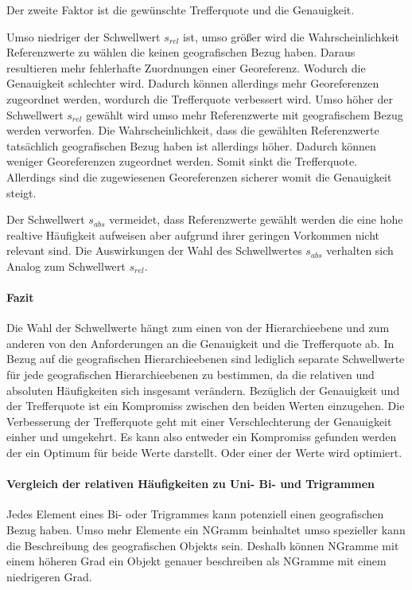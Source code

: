 				Der zweite Faktor ist die gewünschte Trefferquote und die Genauigkeit.

				Umso niedriger der Schwellwert $s_{rel}$ ist, umso größer wird die Wahrscheinlichkeit Referenzwerte zu wählen die keinen geografischen Bezug haben.
				Daraus resultieren mehr fehlerhafte Zuordnungen einer Georeferenz.
				Wodurch die Genauigkeit schlechter wird.
				Dadurch können allerdings mehr Georeferenzen zugeordnet werden, wordurch die Trefferquote verbessert wird.
				Umso höher der Schwellwert $s_{rel}$ gewählt wird umso mehr Referenzwerte mit geografischem Bezug werden verworfen.
				Die Wahrscheinlichkeit, dass die gewählten Referenzwerte tatsächlich geografischen Bezug haben ist allerdings höher.
				Dadurch können weniger Georeferenzen zugeordnet werden.
				Somit sinkt die Trefferquote.
				Allerdings sind die zugewiesenen Georeferenzen sicherer womit die Genauigkeit steigt.

				Der Schwellwert $s_{abs}$ vermeidet, dass Referenzwerte gewählt werden die eine hohe realtive Häufigkeit aufweisen aber aufgrund ihrer geringen Vorkommen nicht relevant sind.
				Die Auswirkungen der Wahl des Schwellwertes $s_{abs}$ verhalten sich Analog zum Schwellwert $s_{rel}$.

			\paragraph{Fazit}

				Die Wahl der Schwellwerte hängt zum einen von der Hierarchieebene und zum anderen von den Anforderungen an die Genauigkeit und die Trefferquote ab.
				In Bezug auf die geografischen Hierarchieebenen sind lediglich separate Schwellwerte für jede geografischen Hierarchieebenen zu bestimmen, da die relativen und absoluten Häufigkeiten sich insgesamt verändern.
				Bezüglich der Genauigkeit und der Trefferquote ist ein Kompromiss zwischen den beiden Werten einzugehen. 
				Die Verbesserung der Trefferquote geht mit einer Verschlechterung der Genauigkeit einher und umgekehrt.
				Es kann also entweder ein Kompromiss gefunden werden der ein Optimum für beide Werte darstellt. 
				Oder einer der Werte wird optimiert.  

	
				\paragraph{Vergleich der relativen Häufigkeiten zu Uni- Bi- und Trigrammen}

					Jedes Element eines Bi- oder Trigrammes kann potenziell einen geografischen Bezug haben. 
					Umso mehr Elemente ein NGramm beinhaltet umso spezieller kann die Beschreibung des geografischen Objekts sein.
					Deshalb können NGramme mit einem höheren Grad ein Objekt genauer beschreiben als NGramme mit einem niedrigeren Grad.

